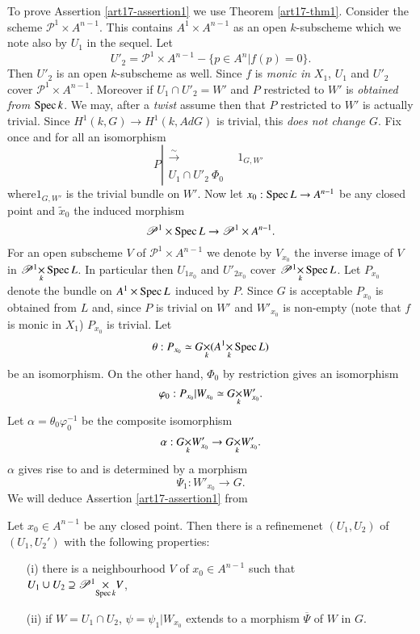 To prove Assertion \ref{art17-assertion1} we use Theorem \ref{art17-thm1}. Consider the scheme $\mathscr{P}^1\times A^{n-1}$. This contains $A^1 \times A^{n-1}$ as an open $k$-subscheme which we note also by $U_1$ in the sequel. Let 
$$
U'_2 = \mathscr{P}^1 \times A^{n-1} - \{p \in A^n | f(p) = 0\}.
$$
Then $U'_2$ is an open $k$-subscheme as well. Since $f$ is {\em monic in} $X_1$, $U_1$ and $U'_2$ cover $\mathscr{P}^1 \times A^{n-1}$. Moreover if $U_1 \cap U'_2 = W'$ and $P$ restricted to $W'$ is {\em obtained from} $\operatorname{Spec} k$. We may, after a {\em twist} assume then that $P$ restricted to $W'$ is actually trivial. Since $H^1 (k,G) \to H^1 (k, Ad G)$ is trivial, this {\em does not change $G$}. Fix once and for all an isomorphism
$$
P \left|
\begin{aligned}
 \xrightarrow{\sim} & ~~ 1_{G,W'}\\
U_1 \cap U'_2 ~ \Phi_0 &
\end{aligned}
\right.
$$  
where\pageoriginale $1_{G,W'}$ is the trivial bundle on $W'$. Now let $x_0: \operatorname{Spec} L \to A^{n-1}$ be any closed point and $\tilde{x}_0$ the induced morphism
$$
\mathscr{P}^1 \times \operatorname{Spec} L \to \mathscr{P}^1 \times A^{n-1}.
$$
For an open subscheme $V$ of $\mathscr{P}^1 \times A^{n-1}$ we denote by $V_{x_0}$ the inverse image of $V$ in $\fprod{\mathscr{P}^1}{\Spec L}{k}$. In particular then $U_{1x_0}$ and $U'_{2x_0}$ cover $\fprod{\mathscr{P}^1}{\Spec L}{k}$. Let $P_{x_0}$ denote the bundle on $A^1 \times \operatorname{Spec} L$ induced by $P$. Since $G$ is acceptable $P_{x_0}$ is obtained from $L$ and, since $P$ is trivial on $W'$ and $W'_{x_0}$ is non-empty (note that $f$ is monic in $X_1$) $P_{x_0}$ is trivial. Let 
$$
\theta : P_{x_0} \simeq \fprod{G}{(\fprod{A^1}{\Spec L}{k})}{k}
$$
be an isomorphism. On the other hand, $\Phi_0$ by restriction gives an isomorphism
$$
\varphi_0 : P_{x_0}|W_{x_0} \simeq \fprod{G}{W'_{x_0}}{k}.
$$
Let $\alpha = \theta_0 \varphi^{-1}_0$ be the composite isomorphism
$$
\alpha : \fprod{G}{W'_{x_0}}{k} \to \fprod{G}{W'_{x_0}}{k}.
$$
$\alpha$ gives rise to and is determined by a morphism
$$
\Psi_1: W'_{x_0} \to G.
$$
We will deduce Assertion \ref{art17-assertion1} from

\begin{assertion}\label{art17-assertion2}
Let $x_0 \in A^{n-1}$ be any closed point. Then there is a refinemenet $(U_1, U_2)$ of $(U_1, U_2')$ with the following properties:
\begin{itemize}
\item[\rm (i)] there is a neighbourhood $V$ of $x_0 \in A^{n-1}$ such that \\$U_1 \cup U_2\supseteq \fprod{\mathscr{P}^1}{V}{\Spec k}$,

\item[\rm (ii)] if $W = U_1 \cap U_2$, $\psi = \psi_1|W_{x_0}$ extends to a morphism $\overline{\Psi}$ of $W$ in $G$. 
\end{itemize}
\end{assertion}

